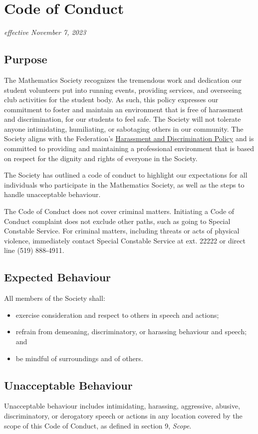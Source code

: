 \section{Code of Conduct}
\emph{effective November 7, 2023}

\subsection{Purpose}
The Mathematics Society recognizes the tremendous work and dedication our student volunteers put into running events, providing services, and overseeing club activities for the student body. As such, this policy expresses our commitment to foster and maintain an environment that is free of harassment and discrimination, for our students to feel safe. The Society will not tolerate anyone intimidating, humiliating, or sabotaging others in our community. The Society aligns with the Federation's \href{https://wusa.ca/document/harassment-and-discrimination-policy/}{Harassment and Discrimination Policy} and is committed to providing and maintaining a professional environment that is based on respect for the dignity and rights of everyone in the Society.

The Society has outlined a code of conduct to highlight our expectations for all individuals who participate in the Mathematics Society, as well as the steps to handle unacceptable behaviour.

The Code of Conduct does not cover criminal matters. Initiating a Code of Conduct complaint does not exclude other paths, such as going to Special Constable Service. For criminal matters, including threats or acts of physical violence, immediately contact Special Constable Service at ext. 22222 or direct line (519) 888-4911.

\subsection{Expected Behaviour}
All members of the Society shall:
\begin{itemize}
	\item exercise consideration and respect to others in speech and actions;
	\item refrain from demeaning, discriminatory, or harassing behaviour and speech; and
	\item be mindful of surroundings and of others.
\end{itemize}

\subsection{Unacceptable Behaviour}
Unacceptable behaviour includes intimidating, harassing, aggressive, abusive, discriminatory, or derogatory speech or actions in any location covered by the scope of this Code of Conduct, as defined in section 9, \textit{Scope}.

